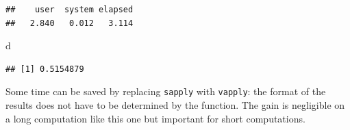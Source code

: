 \documentclass[
  12pt,
  american,
  a4paper,
  extrafontsizes,onecolumn,openright
  ]{memoir}
\newenvironment{Shaded}{\begin{snugshade}}{\end{snugshade}}
\newcommand{\ControlFlowTok}[1]{\textcolor[rgb]{0.13,0.29,0.53}{\textbf{#1}}}
\newcommand{\DecValTok}[1]{\textcolor[rgb]{0.00,0.00,0.81}{#1}}
\newcommand{\FunctionTok}[1]{\textcolor[rgb]{0.13,0.29,0.53}{\textbf{#1}}}
\newcommand{\NormalTok}[1]{#1}
\newcommand{\OtherTok}[1]{\textcolor[rgb]{0.56,0.35,0.01}{#1}}
\newcommand{\SpecialCharTok}[1]{\textcolor[rgb]{0.81,0.36,0.00}{\textbf{#1}}}
\begin{document}
\begin{Shaded}
\end{Shaded}

\begin{verbatim}
##    user  system elapsed 
##   2.840   0.012   3.114
\end{verbatim}

\begin{Shaded}
\begin{Highlighting}[]
\NormalTok{d}
\end{Highlighting}
\end{Shaded}

\begin{verbatim}
## [1] 0.5154879
\end{verbatim}

\normalsize

Some time can be saved by replacing \texttt{sapply} with \texttt{vapply}: the format of the results does not have to be determined by the function.
The gain is negligible on a long computation like this one but important for short computations.

\scriptsize
\end{document}
